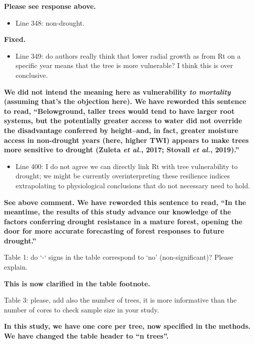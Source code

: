 \documentclass[
]{article}
\providecommand{\tightlist}{%
  \setlength{\itemsep}{0pt}\setlength{\parskip}{0pt}}
\begin{document}
\textbf{Please see response above.}

\begin{itemize}
\tightlist
\item
  Line 348: non-drought.
\end{itemize}

\textbf{Fixed.}

\begin{itemize}
\tightlist
\item
  Line 349: do authors really think that lower radial growth as from Rt
  on a specific year means that the tree is more vulnerable? I think
  this is over conclusive.
\end{itemize}

\textbf{We did not intend the meaning here as vulnerability \emph{to
mortality} (assuming that's the objection here). We have reworded this
sentence to read, ``Belowground, taller trees would tend to have larger
root systems, but the potentially greater access to water did not
override the disadvantage conferred by height--and, in fact, greater
moisture access in non-drought years (here, higher TWI) appears to make
trees more sensitive to drought (Zuleta \emph{et al.}, 2017; Stovall
\emph{et al.}, 2019).''}

\begin{itemize}
\tightlist
\item
  Line 400: I do not agree we can directly link Rt with tree
  vulnerability to drought; we might be currently overinterpreting these
  resilience indices extrapolating to physiological conclusions that do
  not necessary need to hold.
\end{itemize}

\textbf{See above comment. We have reworded this sentence to read, ``In
the meantime, the results of this study advance our knowledge of the
factors conferring drought resistance in a mature forest, opening the
door for more accurate forecasting of forest responses to future
drought.''}

Table 1: do `-` signs in the table correspond to `no' (non-significant)?
Please explain.

\textbf{This is now clarified in the table footnote.}

Table 3: please, add also the number of trees, it is more informative
than the number of cores to check sample size in your study.

\textbf{In this study, we have one core per tree, now specified in the
methods. We have changed the table header to ``n trees''.}
\end{document}
